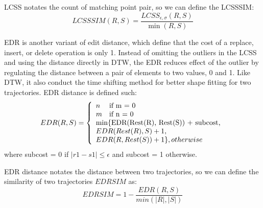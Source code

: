 LCSS notates the count of matching point pair, so we can define the LCSSSIM:
\begin{equation}\label{sim:less}
	LCSSSIM(R,S)=\frac{LCSS_{\epsilon ,\sigma }(R,S)}{\min(R,S)}
\end{equation}

EDR is another variant of edit distance, which define that the cost of a replace, insert, or delete operation is only 1. Instead of omitting the outliers in the LCSS and using the distance directly in DTW, the EDR reduces effect of the outlier by regulating the distance between a pair of elements to two values, 0 and 1. Like DTW, it also conduct the time shifting method for better shape fitting for two trajectories. EDR distance is defined such:
\begin{equation}
	EDR(R, S) = \left\{
	\begin{array}{ll}
		n & \text{if m = 0} \\
		m & \text{if n = 0} \\
		\multicolumn{2}{l}{\text{min\{EDR(Rest(R), Rest(S)) + subcost,}} \\
		\multicolumn{2}{l}{EDR(Rest(R), S) + 1, } \\
		\multicolumn{2}{l}{EDR(R, Rest(S)) + 1\}, otherwise}  
	\end{array}
	\right.
\end{equation}
where subcost = 0 if $|r1 - s1| \leq \epsilon$ and subcost = 1 otherwise.

EDR distance notates the distance between two trajectories, so we can define the similarity of two trajectories $EDRSIM$ as:
\begin{equation}
	EDRSIM=1 - \frac{EDR(R,S)}{min(|R|, |S|)}
\end{equation}
